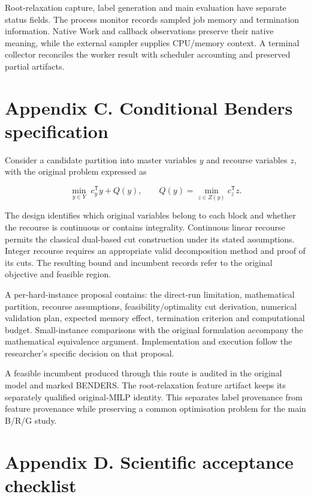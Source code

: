 \documentclass[
  british,
  10pt,
]{article}
\begin{document}
Root-relaxation capture, label generation and main evaluation have
separate status fields. The process monitor records sampled job memory
and termination information. Native Work and callback observations
preserve their native meaning, while the external sampler supplies
CPU/memory context. A terminal collector reconciles the worker result
with scheduler accounting and preserved partial artifacts.

\section{Appendix C. Conditional Benders
specification}\label{appendix-c.-conditional-benders-specification}

Consider a candidate partition into master variables \(y\) and recourse
variables \(z\), with the original problem expressed as

\[
\min_{y\in Y}\;c_y^{\mathsf T}y+Q(y),
\qquad Q(y)=\min_{z\in Z(y)}c_z^{\mathsf T}z.
\tag{C.1}
\]

The design identifies which original variables belong to each block and
whether the recourse is continuous or contains integrality. Continuous
linear recourse permits the classical dual-based cut construction under
its stated assumptions. Integer recourse requires an appropriate valid
decomposition method and proof of its cuts. The resulting bound and
incumbent records refer to the original objective and feasible region.

A per-hard-instance proposal contains: the direct-run limitation,
mathematical partition, recourse assumptions, feasibility/optimality cut
derivation, numerical validation plan, expected memory effect,
termination criterion and computational budget. Small-instance
comparisons with the original formulation accompany the mathematical
equivalence argument. Implementation and execution follow the
researcher's specific decision on that proposal.

A feasible incumbent produced through this route is audited in the
original model and marked BENDERS. The root-relaxation feature artifact
keeps its separately qualified original-MILP identity. This separates
label provenance from feature provenance while preserving a common
optimisation problem for the main B/R/G study.

\section{Appendix D. Scientific acceptance
checklist}\label{appendix-d.-scientific-acceptance-checklist}
\end{document}
